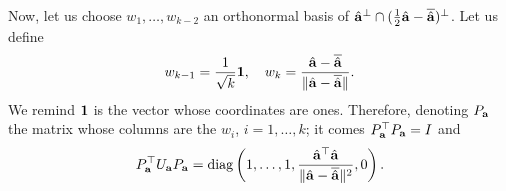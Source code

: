 Now, let us choose $w_1,\dots,w_{k-2}$ an orthonormal basis of $\hat{\mathbf{a}}^\perp\cap(\frac{1}{2}\hat{\mathbf{a}}-\overline{\hat{\mathbf{a}}})^\perp$. Let us define 
\begin{equation}\label{lowdoe:eq:wk-1,wk}
    w_{k-1} = \frac{1}{\sqrt k}\mathbf{1} ,\quad w_{k} = \frac{\hat{\mathbf{a}} - \overline{\hat{\mathbf{a}}}}{\|\hat{\mathbf{a}}-\overline{\hat{\mathbf{a}}}\|}.
\end{equation}
We remind $\mathbf{1}$ is the vector whose coordinates are ones. Therefore, denoting $P_{\mathbf{a}}$ the matrix whose columns are the $w_i$, $i=1,\dots,k$; it comes $P_{\mathbf{a}}^{\top}P_{\mathbf{a}}=I$ and
    \begin{equation}
        P^{\top}_{\mathbf{a}}U_{\mathbf{a}}P_{\mathbf{a}} = \operatorname{diag}\left(1,\dots,1,\frac{\hat{\mathbf{a}}^{\top}\hat{\mathbf{a}}}{\|\hat{\mathbf{a}}-\overline{\hat{\mathbf{a}}}\|^2}, 0\right).
    \end{equation}



